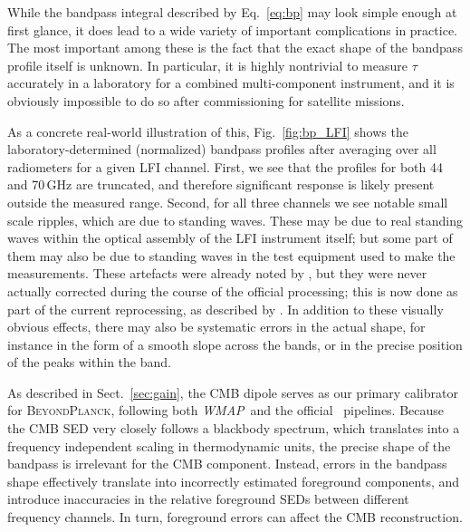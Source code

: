 \documentclass[onecolumn]{aa}
\def\WMAP{\emph{WMAP}}
\newcommand{\BP}{\textsc{BeyondPlanck}}
\begin{document}
While the bandpass integral described by Eq.~\eqref{eq:bp} may look
simple enough at first glance, it does lead to a wide variety of
important complications in practice. The most important among these is
the fact that the exact shape of the bandpass profile itself is
unknown. In particular, it is highly nontrivial to measure $\tau$
accurately in a laboratory for a combined multi-component instrument,
and it is obviously impossible to do so after commissioning for
satellite missions.

As a concrete real-world illustration of this, Fig.~\ref{fig:bp_LFI}
shows the laboratory-determined (normalized) bandpass profiles after
averaging over all radiometers for a given LFI channel. First, we see
that the profiles for both 44 and 70\,GHz are truncated, and therefore
significant response is likely present outside the measured
range. Second, for all three channels we see notable small scale
ripples, which are due to standing waves. These may be due to real
standing waves within the optical assembly of the LFI instrument
itself; but some part of them may also be due to standing waves in the
test equipment used to make the measurements. These artefacts were
already noted by \citet{zonca2009}, but they were never actually
corrected during the course of the official processing; this is now
done as part of the current reprocessing, as described by
\citet{bp09}. In addition to these visually obvious effects, there may
also be systematic errors in the actual shape, for instance in the
form of a smooth slope across the bands, or in the precise position of
the peaks within the band.

As described in Sect.~\ref{sec:gain}, the CMB dipole serves as our primary
calibrator for \BP, following both \WMAP\ and the official
\Planck\ pipelines. Because the CMB SED very closely follows a
blackbody spectrum, which translates into a frequency independent
scaling in thermodynamic units, the precise shape of the bandpass is
irrelevant for the CMB component. Instead, errors in the bandpass
shape effectively translate into incorrectly estimated foreground
components, and introduce inaccuracies in the relative foreground
SEDs between different frequency channels. In turn, foreground errors
can affect the CMB reconstruction.
\end{document}
